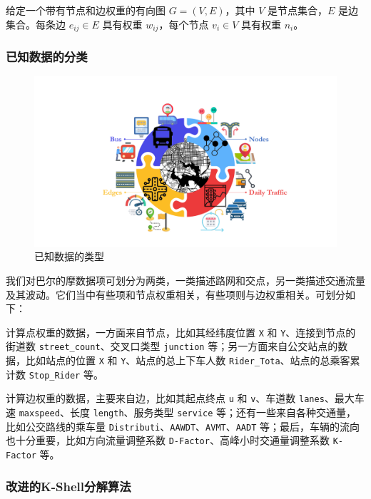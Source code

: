 \documentclass[12pt, a4paper, oneside]{ctexart}
\begin{document}
给定一个带有节点和边权重的有向图 \(G = (V, E)\)，其中 \(V\) 是节点集合，\(E\) 是边集合。每条边 \(e_{ij} \in E\) 具有权重 \(w_{ij}\)，每个节点 \(v_i \in V\) 具有权重 \(n_i\)。

\subsubsection{已知数据的分类}

\begin{figure}[H]
  \centering
  \includegraphics[width=\textwidth]{figures/data.pdf}
  \caption{已知数据的类型}
  \label{fig:data}
\end{figure}

我们对巴尔的摩数据项可划分为两类，一类描述路网和交点，另一类描述交通流量及其波动。它们当中有些项和节点权重相关，有些项则与边权重相关。可划分如下：

计算点权重的数据，一方面来自节点，比如其经纬度位置 \texttt{X} 和 \texttt{Y}、连接到节点的街道数 \texttt{street\_count}、交叉口类型 \texttt{junction} 等；另一方面来自公交站点的数据，比如站点的位置 \texttt{X} 和 \texttt{Y}、站点的总上下车人数 \texttt{Rider\_Tota}、站点的总乘客累计数 \texttt{Stop\_Rider} 等。

计算边权重的数据，主要来自边，比如其起点终点 \texttt{u} 和 \texttt{v}、车道数 \texttt{lanes}、最大车速 \texttt{maxspeed}、长度 \texttt{length}、服务类型 \texttt{service} 等；还有一些来自各种交通量，比如公交路线的乘车量 \texttt{Distributi}、\texttt{AAWDT}、\texttt{AVMT}、\texttt{AADT} 等；最后，车辆的流向也十分重要，比如方向流量调整系数 \texttt{D-Factor}、高峰小时交通量调整系数 \texttt{K-Factor} 等。

\subsubsection{改进的K-Shell分解算法}
\end{document}
